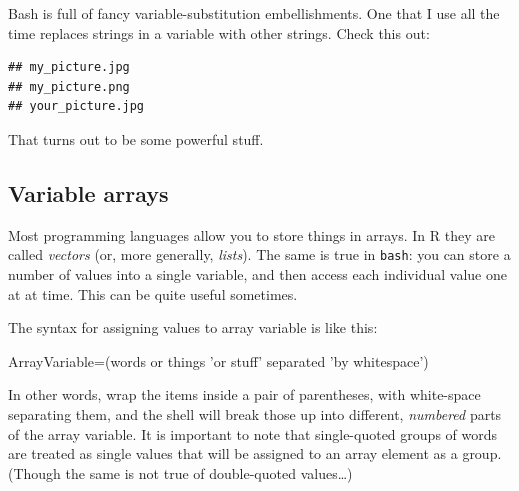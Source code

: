 \documentclass[]{krantz}
\makeatletter
\newenvironment{Shaded}{\begin{snugshade}}{\end{snugshade}}
\newcommand{\BuiltInTok}[1]{#1}
\newcommand{\NormalTok}[1]{#1}
\newcommand{\StringTok}[1]{\textcolor[rgb]{0.5,0.5,0.5}{#1}}
\newcommand{\VariableTok}[1]{\textcolor[rgb]{0,0,0}{#1}}
\newenvironment{kframe}{%
\medskip{}
\setlength{\fboxsep}{.8em}
 \def\at@end@of@kframe{}%
 \ifinner\ifhmode%
  \def\at@end@of@kframe{\end{minipage}}%
  \begin{minipage}{\columnwidth}%
 \fi\fi%
 \def\FrameCommand##1{\hskip\@totalleftmargin \hskip-\fboxsep
 \colorbox{shadecolor}{##1}\hskip-\fboxsep
     \hskip-\linewidth \hskip-\@totalleftmargin \hskip\columnwidth}%
 \MakeFramed {\advance\hsize-\width
   \@totalleftmargin\z@ \linewidth\hsize
   \@setminipage}}%
 {\par\unskip\endMakeFramed%
 \at@end@of@kframe}
\renewenvironment{Shaded}{\begin{kframe}}{\end{kframe}}
\makeatother
\begin{document}
Bash is full of fancy variable-substitution embellishments. One that
I use all the time replaces strings in a variable with other strings.
Check this out:

\begin{Shaded}
\end{Shaded}

\begin{verbatim}
## my_picture.jpg
## my_picture.png
## your_picture.jpg
\end{verbatim}

That turns out to be some powerful stuff.

\hypertarget{variable-arrays}{%
\subsection{Variable arrays}\label{variable-arrays}}

Most programming languages allow you to store things in arrays. In R they
are called \emph{vectors} (or, more generally, \emph{lists}). The same is true in
\texttt{bash}: you can store a number of values into a single variable, and then
access each individual value one at at time. This can be quite useful sometimes.

The syntax for assigning values to array variable is like this:

\begin{Shaded}
\begin{Highlighting}[]
\VariableTok{ArrayVariable=(}\NormalTok{words or things }\StringTok{'or stuff'}\NormalTok{ separated }\StringTok{'by whitespace'}\VariableTok{)}
\end{Highlighting}
\end{Shaded}

In other words, wrap the items inside a pair of parentheses, with white-space
separating them, and the shell will break those up into different, \emph{numbered}
parts of the array variable. It is important to note that single-quoted groups of words
are treated as single values that will be assigned to an array element as a group.
(Though the same is not true of double-quoted values\ldots{})
\end{document}
